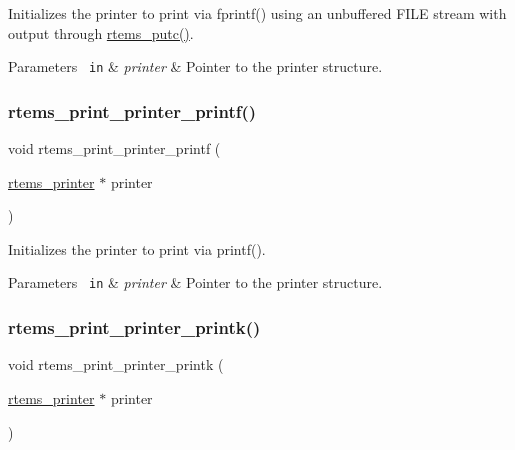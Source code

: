 Initializes the printer to print via fprintf() using an unbuffered F\+I\+LE stream with output through \mbox{\hyperlink{bspIo_8h_a6fd11f34260f10035f38a051af872e1e}{rtems\+\_\+putc()}}. 


\begin{DoxyParams}[1]{Parameters}
\mbox{\texttt{ in}}  & {\em printer} & Pointer to the printer structure. \\
\hline
\end{DoxyParams}
\mbox{\label{group__RTEMSPrintSupport_ga90a67702ffe1d15690e1de2b15bf229f}} 
\subsubsection{\texorpdfstring{rtems\_print\_printer\_printf()}{rtems\_print\_printer\_printf()}}
{\footnotesize\ttfamily void rtems\+\_\+print\+\_\+printer\+\_\+printf (\begin{DoxyParamCaption}\item[{\mbox{\hyperlink{structrtems__printer}{rtems\+\_\+printer}} $\ast$}]{printer }\end{DoxyParamCaption})}



Initializes the printer to print via printf(). 


\begin{DoxyParams}[1]{Parameters}
\mbox{\texttt{ in}}  & {\em printer} & Pointer to the printer structure. \\
\hline
\end{DoxyParams}
\mbox{\label{group__RTEMSPrintSupport_ga553b725c5361554dc9788e1a6a82b373}} 
\subsubsection{\texorpdfstring{rtems\_print\_printer\_printk()}{rtems\_print\_printer\_printk()}}
{\footnotesize\ttfamily void rtems\+\_\+print\+\_\+printer\+\_\+printk (\begin{DoxyParamCaption}\item[{\mbox{\hyperlink{structrtems__printer}{rtems\+\_\+printer}} $\ast$}]{printer }\end{DoxyParamCaption})}



